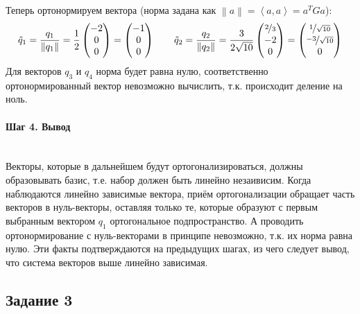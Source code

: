\documentclass{article}
\begin{document}
    Теперь ортонормируем вектора (норма задана как $\left\lVert a\right\rVert = \left\langle a, a\right\rangle = a^TGa$):
    $$\tilde{q}_1 = \frac{q_1}{\left\lVert q_1\right\rVert} = \frac{1}{2}\begin{pmatrix}
            -2 \\ 0 \\ 0
        \end{pmatrix} = \begin{pmatrix}
            -1 \\ 0 \\ 0
        \end{pmatrix}\qquad \tilde{q}_2 = \frac{q_2}{\left\lVert q_2\right\rVert} = \frac{3}{2\sqrt{10}}\begin{pmatrix}
            \nicefrac{2}{3} \\ -2 \\ 0
        \end{pmatrix} = \begin{pmatrix}
            \nicefrac{1}{\sqrt{10}} \\ \nicefrac{-3}{\sqrt{10}} \\ 0
        \end{pmatrix}$$
    Для векторов $q_3$ и $q_4$ норма будет равна нулю, соответственно ортонормированный вектор невозможно вычислить, т.к. происходит деление на ноль.

    \paragraph*{Шаг 4. Вывод} \, \\
    Векторы, которые в дальнейшем будут ортогонализироваться, должны образовывать базис, т.е. набор должен быть линейно незаивисим. Когда наблюдаются линейно зависимые вектора, приём ортогонализации обращает часть векторов в нуль-векторы, оставляя только те, которые образуют с первым выбранным вектором $q_1$ ортогональное подпространство. А проводить ортонормирование с нуль-векторами в принципе невозможно, т.к. их норма равна нулю. Эти факты подтверждаются на предыдущих шагах, из чего следует вывод, что система векторов выше линейно зависимая.

    \subsection*{Задание 3}
\end{document}
